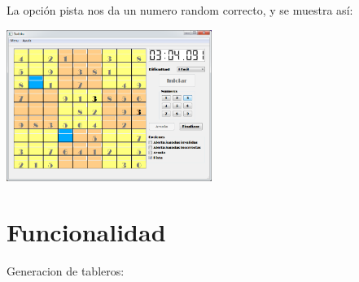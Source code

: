 \documentclass[12pt,oneside]{book}
\begin{document}
\begin{center}
	La opción pista nos da un numero random correcto, y se muestra así:

	\includegraphics[width=0.5\textwidth]{./imagenes/pista_juego.png}  
\end{center}	

	
\chapter{Funcionalidad}
\begin{center} Generacion de tableros:\end{center}
\end{document}
